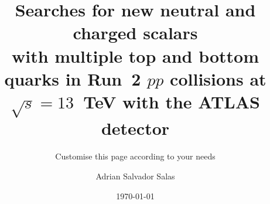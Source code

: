 \documentclass[
	a4paper, %
	fontsize=11pt, %
	twoside=true, %
	numbers=noenddot, %
]{kaobook}
\begin{document}



\title[Searches for new neutral and charged scalars with multiple top and bottom quarks in Run~2 $pp$ collisions at $\sqrt{s}=13$~TeV with the ATLAS detector]{Searches for new neutral and charged scalars \\ with multiple top and bottom quarks in Run~2 $pp$ collisions at $\sqrt{s}=13$~TeV with the ATLAS detector}
\subtitle{Customise this page according to your needs}


\author[Adrian Salvador Salas]{Adrian Salvador Salas} %

\date{\today}

\publishers{An Awesome Publisher}


\frontmatter %




\makeatletter
\uppertitleback{\@titlehead} %
\end{document}
